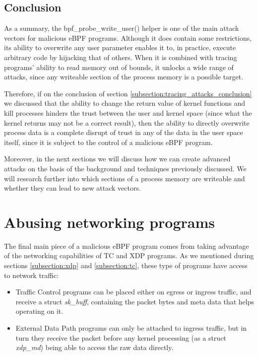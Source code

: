 \documentclass[12pt]{report} %
\begin{document}
\subsection{Conclusion}
As a summary, the bpf\_probe\_write\_user() helper is one of the main attack vectors for malicious eBPF programs. Although it does contain some restrictions, its ability to overwrite any user parameter enables it to, in practice, execute arbitrary code by hijacking that of others. When it is combined with tracing programs' ability to read memory out of bounds, it unlocks a wide range of attacks, since any writeable section of the process memory is a possible target. 

Therefore, if on the conclusion of section \ref{subsection:tracing_attacks_conclusion} we discussed that the ability to change the return value of kernel functions and kill processes hinders the trust between the user and kernel space (since what the kernel returns may not be a correct result), then the ability to directly overwrite process data is a complete disrupt of trust in any of the data in the user space itself, since it is subject to the control of a malicious eBPF program.

Moreover, in the next sections we will discuss how we can create advanced attacks on the basis of the background and techniques previously discussed. We will research further into which sections of a process memory are writeable and whether they can lead to new attack vectors.


\section{Abusing networking programs}\label{section:abusing_networking}
The final main piece of a malicious eBPF program comes from taking advantage of the networking capabilities of TC and XDP programs. As we mentioned during sections \ref{subsection:xdp} and \ref{subsection:tc}, these type of programs have access to network traffic:
\begin{itemize}
\item Traffic Control programs can be placed either on egress or ingress traffic, and receive a struct \textit{sk\_buff}, containing the packet bytes and meta data that helps operating on it.
\item External Data Path programs can only be attached to ingress traffic, but in turn they receive the packet before any kernel processing (as a struct \textit{xdp\_md}) being able to access the raw data directly.
\end{itemize}
\end{document}
